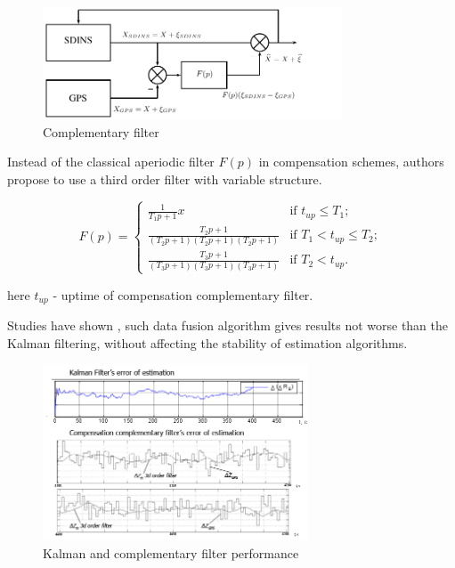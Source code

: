 \documentclass[conference, utf8]{IEEEtran}
\begin{document}
\begin{figure}[!t]
\centering
\includegraphics[width=3.5in]{f1.pdf}
\caption{Complementary filter}
\label{fig:compl}
\end{figure}

Instead of the classical aperiodic filter $F(p)$ in compensation schemes, authors 
propose to use a third order filter with variable structure.

\begin{equation}
\displaystyle F(p) = \left\{ 
    \begin{array}{ll}
       \displaystyle \frac{1}{T_{1} p+1} x & \mbox{if $t_{up} \le T_{1}$};\\
       \displaystyle \frac{T_{2} p+1}{(T_{2} p+1)(T_{2} p+1)(T_{2} p+1)} & \mbox{if $T_{1} <t_{up} \le T_{2}$};\\
       \displaystyle \frac{T_{3} p+1}{(T_{3} p+1)(T_{3} p+1)(T_{3} p+1)}& \mbox{if $T_{2} < t_{up}$}.
    \end{array} 
\right.
\label{eq:comp_f}
\end{equation}

here $t_{up}$ - uptime of compensation complementary filter. 

Studies have shown \cite{bib:rogozhyn}, such data fusion algorithm gives results not worse than the 
Kalman filtering, without affecting the stability of estimation algorithms.

\begin{figure}[!t]
  \centering
  \includegraphics[width=3.1in]{f22}
  \caption{Kalman and complementary filter performance}
  \label{fig:sim_kalman}
\end{figure}
\end{document}
